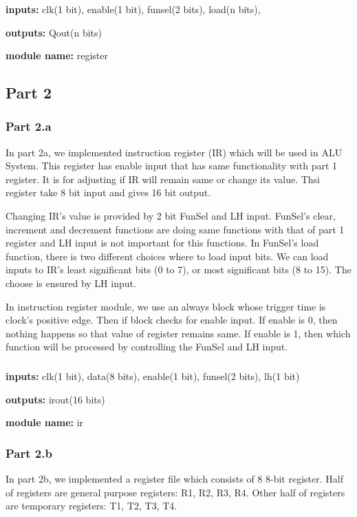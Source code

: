\documentclass[pdftex,12pt,a4paper]{article}
\begin{document}
\subsubsection{}
\textbf{inputs:}    clk(1 bit),
enable(1 bit),
funsel(2 bits),
load(n bits),

\textbf{outputs:}    
Qout(n bits)

\textbf{module name:} register

\subsection{Part 2}
\subsubsection{Part 2.a}
In part 2a, we implemented instruction register (IR) which will be used in ALU System.
This register has enable input that has same functionality with part 1 register. It
is for adjusting if IR will remain same or change its value. Thsi register take 8
bit input and gives 16 bit output.

Changing IR's value is provided by 2 bit FunSel and LH input. FunSel's clear,
increment and decrement functions are doing same functions with that of part 1
register and LH input is not important for this functions. In FunSel's load function,
there is two different choices where to load input bits. We can load inputs to IR's
least significant bits (0 to 7), or most significant bits (8 to 15). The choose is
ensured by LH input.

In instruction register module, we use an always block whose trigger time is clock's
positive edge. Then if block checks for enable input.
If enable is 0, then nothing happens so that value of register remains same. If
enable is 1, then which function will be processed by controlling the FunSel 
and LH input.

\subsubsection{}
\textbf{inputs:}    clk(1 bit),
data(8 bits),
enable(1 bit),
funsel(2 bits),
lh(1 bit)

\textbf{outputs:}    
irout(16 bits)

\textbf{module name:} ir

\subsubsection{Part 2.b}
In part 2b, we implemented a register file which consists of 8 8-bit register. Half of
registers are general purpose registers: R1, R2, R3, R4. Other half of registers
are temporary registers: T1, T2, T3, T4. 
\end{document}

